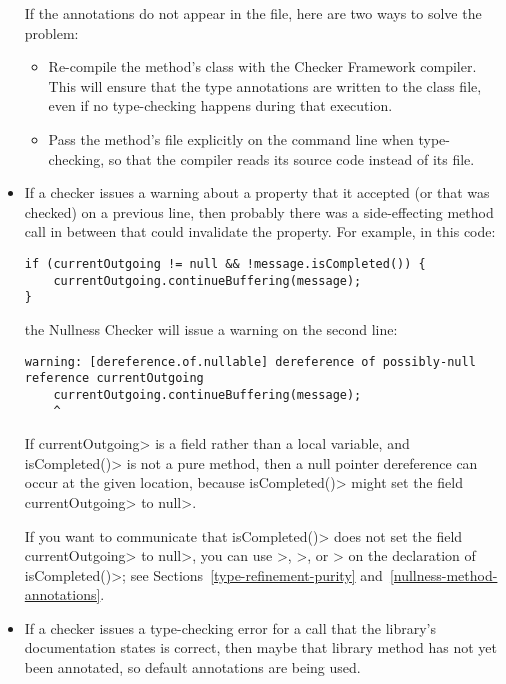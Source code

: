 \begin{itemize}
If the annotations do not appear in the  file, here are two
ways to solve the problem:
\begin{itemize}
\item
  Re-compile the method's class with the Checker Framework compiler.  This will
  ensure that the type annotations are written to the class file, even if
  no type-checking happens during that execution.
\item
  Pass the method's file explicitly on the command line when type-checking,
  so that the compiler reads its source code instead of its 
  file.
\end{itemize}

\item
If a checker issues a warning about a property that it accepted (or that
was checked) on a previous line, then probably there was a side-effecting
method call in between that could invalidate the property.  For example, in
this code:

\begin{Verbatim}
if (currentOutgoing != null && !message.isCompleted()) {
    currentOutgoing.continueBuffering(message);
}
\end{Verbatim}

\noindent
the Nullness Checker will issue a warning on the second line:
\begin{Verbatim}
warning: [dereference.of.nullable] dereference of possibly-null reference currentOutgoing
    currentOutgoing.continueBuffering(message);
    ^
\end{Verbatim}

If \<currentOutgoing> is a field rather than a local variable, and
\<isCompleted()> is not a pure method, then a null pointer
dereference can occur at the given location, because \<isCompleted()> might set
the field \<currentOutgoing> to \<null>.

If you want to communicate that
\<isCompleted()> does not set the field \<currentOutgoing> to \<null>, you can use
\<>,
\<>,
or \<> on the
declaration of \<isCompleted()>; see Sections~\ref{type-refinement-purity}
and~\ref{nullness-method-annotations}.


\item
If a checker issues a type-checking error for a call that the library's
documentation states is correct, then maybe that library method has not yet
been annotated, so default annotations are being used.


\end{itemize}
